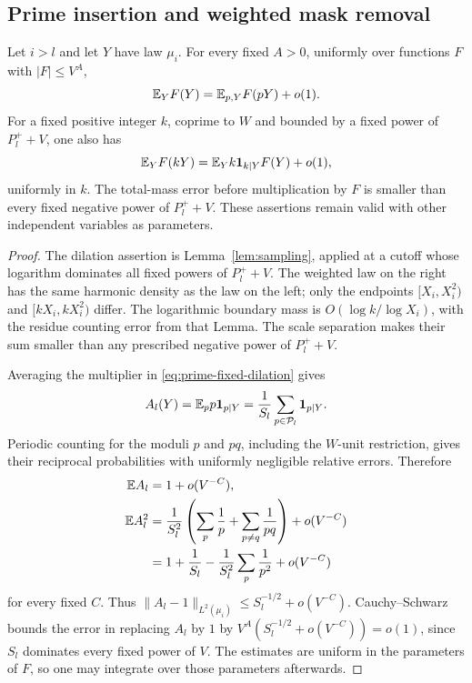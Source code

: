 \subsection{Prime insertion and weighted mask removal}

\begin{lemma}\label{lem:prime-insertion}
Let $i>l$ and let $Y$ have law $\mu_i$.  For every fixed $A>0$, uniformly
over functions $F$ with $|F|\le V^A$,
\begin{equation}
 \mathbb E_Y F(Y)=\mathbb E_{p,Y}F(pY)+o(1).
 \label{eq:prime-average-insertion}
\end{equation}
For a fixed positive integer $k$, coprime to $W$ and bounded by a fixed
power of $P_l^++V$, one also has
\begin{equation}
 \mathbb E_Y F(kY)=\mathbb E_Y k\mathbf 1_{k\mid Y}F(Y)+o(1),
 \label{eq:prime-fixed-dilation}
\end{equation}
uniformly in $k$.  The total-mass error before multiplication by $F$ is
smaller than every fixed negative power of $P_l^++V$.
These assertions remain valid with other independent variables as
parameters.
\end{lemma}

\begin{proof}
The dilation assertion is Lemma~\ref{lem:sampling}, applied at a cutoff
whose logarithm dominates all fixed powers of $P_l^++V$.  The weighted
law on the right has the same harmonic density as the law on the left;
only the endpoints $[X_i,X_i^2)$ and $[kX_i,kX_i^2)$ differ.
The logarithmic boundary mass is $O(\log k/\log X_i)$, with the residue
counting error from that Lemma.  The scale separation makes their sum
smaller than any prescribed negative power of $P_l^++V$.

Averaging the multiplier in \eqref{eq:prime-fixed-dilation} gives
\[
 A_l(Y)=\mathbb E_p p\mathbf 1_{p\mid Y}
       =\frac1{S_l}\sum_{p\in\mathcal P_l}\mathbf 1_{p\mid Y}.
\]
Periodic counting for the moduli $p$ and $pq$, including the $W$-unit
restriction, gives their reciprocal probabilities with uniformly
negligible relative errors.  Therefore
\begin{align*}
 \mathbb E A_l&=1+o(V^{-C}),\\
 \mathbb E A_l^2
 &=\frac1{S_l^2}
   \left(\sum_p\frac1p+\sum_{p\ne q}\frac1{pq}\right)
   +o(V^{-C})\\
 &=1+\frac1{S_l}-\frac1{S_l^2}\sum_p\frac1{p^2}+o(V^{-C})
\end{align*}
for every fixed $C$.  Thus
$\|A_l-1\|_{L^2(\mu_i)}\le S_l^{-1/2}+o(V^{-C})$.
Cauchy--Schwarz bounds the error in replacing $A_l$ by $1$ by
$V^A(S_l^{-1/2}+o(V^{-C}))=o(1)$, since $S_l$ dominates every fixed
power of $V$.  The estimates are uniform in the parameters of $F$, so
one may integrate over those parameters afterwards.
\end{proof}

